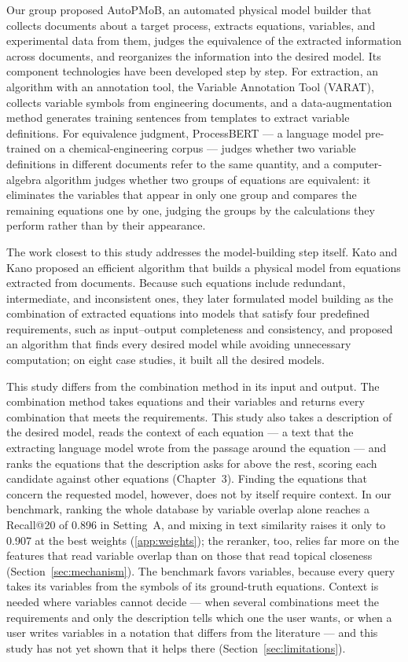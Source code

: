 Our group proposed AutoPMoB, an automated physical model builder that collects documents about a
target process, extracts equations, variables, and experimental data from them, judges the
equivalence of the extracted information across documents, and reorganizes the information into
the desired model\cite{AutoPMoBCSTR,AutoPMoBProto}. Its component technologies have been developed
step by step. For extraction, an algorithm with an annotation tool, the Variable Annotation Tool
(VARAT), collects variable symbols from engineering documents\cite{VARAT}, and a data-augmentation
method generates training sentences from templates to extract variable definitions\cite{Nagayama}.
For equivalence judgment, ProcessBERT --- a language model pre-trained on a chemical-engineering
corpus --- judges whether two variable definitions in different documents refer to the same
quantity\cite{ProcessBERT}, and a computer-algebra algorithm judges whether two groups of equations
are equivalent\cite{DAEEquiv,ZhangEquiv}: it eliminates the variables that appear in only one
group and compares the remaining equations one by one, judging the groups by the calculations they
perform rather than by their appearance.

The work closest to this study addresses the model-building step itself. Kato and Kano proposed an
efficient algorithm that builds a physical model from equations extracted from
documents\cite{KatoESCAPE}. Because such equations include redundant, intermediate, and
inconsistent ones, they later formulated model building as the combination of extracted equations
into models that satisfy four predefined requirements, such as input--output completeness and
consistency, and proposed an algorithm that finds every desired model while avoiding unnecessary
computation; on eight case studies, it built all the desired models\cite{CombineEq}.

This study differs from the combination method in its input and output. The combination method
takes equations and their variables and returns every combination that meets the requirements.
This study also takes a description of the desired model, reads the context of each equation ---
a text that the extracting language model wrote from the passage around the equation --- and ranks
the equations that the description asks for above the rest, scoring each candidate against other
equations (Chapter~3). Finding the equations that concern the requested model, however, does not by
itself require context. In our benchmark, ranking the whole database by variable overlap alone
reaches a Recall@20 of 0.896 in Setting~A, and mixing in text similarity raises it only to 0.907 at
the best weights (\ref{app:weights}); the reranker, too, relies far more on the features
that read variable overlap than on those that read topical closeness (Section~\ref{sec:mechanism}). The benchmark favors variables, because every
query takes its variables from the symbols of its ground-truth equations. Context is needed
where variables cannot decide --- when several combinations meet the requirements and only the
description tells which one the user wants, or when a user writes variables in a notation that
differs from the literature --- and this study has not yet shown that it helps there
(Section~\ref{sec:limitations}).

